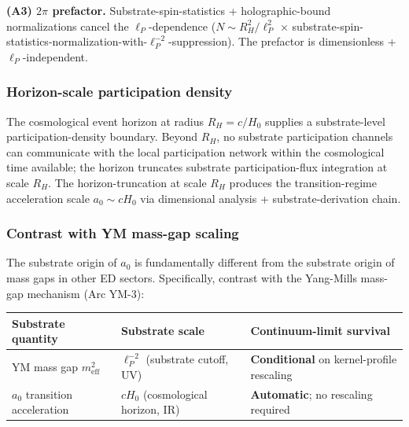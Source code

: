 \documentclass[
  11pt,a4paper]{article}
\newcounter{none} %
\begin{document}
\textbf{(A3) \(2\pi\) prefactor.} Substrate-spin-statistics +
holographic-bound normalizations cancel the \(\ell_P\)-dependence
(\(N \sim R_H^2/\ell_P^2\) ×
substrate-spin-statistics-normalization-with-\(\ell_P^{-2}\)-suppression).
The prefactor is dimensionless + \(\ell_P\)-independent.

\subsubsection{Horizon-scale participation
density}\label{horizon-scale-participation-density}

The cosmological event horizon at radius \(R_H = c/H_0\) supplies a
substrate-level participation-density boundary. Beyond \(R_H\), no
substrate participation channels can communicate with the local
participation network within the cosmological time available; the
horizon truncates substrate participation-flux integration at scale
\(R_H\). The horizon-truncation at scale \(R_H\) produces the
transition-regime acceleration scale \(a_0 \sim cH_0\) via dimensional
analysis + substrate-derivation chain.

\subsubsection{Contrast with YM mass-gap
scaling}\label{contrast-with-ym-mass-gap-scaling}

The substrate origin of \(a_0\) is fundamentally different from the
substrate origin of mass gaps in other ED sectors. Specifically,
contrast with the Yang-Mills mass-gap mechanism (Arc YM-3):

{\def\LTcaptype{none} %
\begin{longtable}[]{@{}
  >{\raggedright\arraybackslash}p{}
  >{\raggedright\arraybackslash}p{}
  >{\raggedright\arraybackslash}p{}@{}}
\toprule\noalign{}
\begin{minipage}[b]{\linewidth}\raggedright
Substrate quantity
\end{minipage} & \begin{minipage}[b]{\linewidth}\raggedright
Substrate scale
\end{minipage} & \begin{minipage}[b]{\linewidth}\raggedright
Continuum-limit survival
\end{minipage} \\
\midrule\noalign{}
\endhead
\bottomrule\noalign{}
\endlastfoot
YM mass gap \(m_\mathrm{eff}^2\) & \(\ell_P^{-2}\) (substrate cutoff,
UV) & \textbf{Conditional} on kernel-profile rescaling \\
\(a_0\) transition acceleration & \(cH_0\) (cosmological horizon, IR) &
\textbf{Automatic}; no rescaling required \\
\end{longtable}
}
\end{document}
